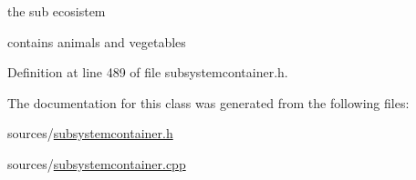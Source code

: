 the sub ecosistem 

contains animals and vegetables 

Definition at line 489 of file subsystemcontainer.h.



The documentation for this class was generated from the following files:\begin{DoxyCompactItemize}
\item 
sources/\hyperlink{subsystemcontainer_8h}{subsystemcontainer.h}\item 
sources/\hyperlink{subsystemcontainer_8cpp}{subsystemcontainer.cpp}\end{DoxyCompactItemize}
